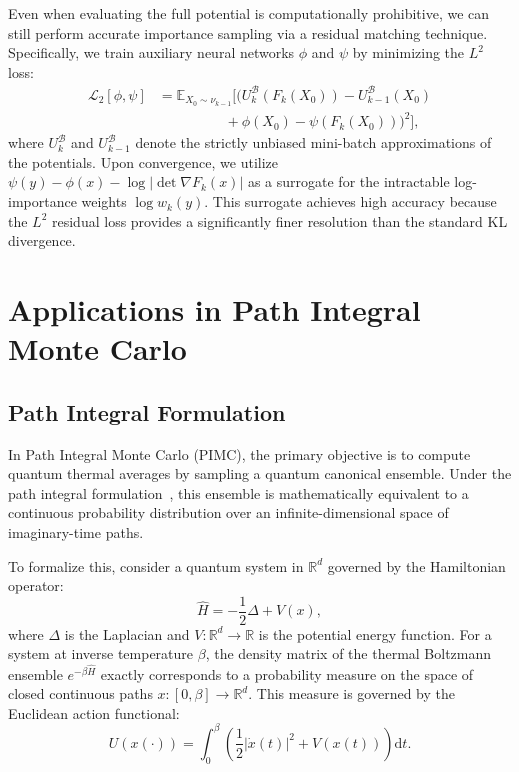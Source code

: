 \documentclass[%
 reprint,
 amsmath,amssymb,
 aps,
 pre,
]{revtex4-2}
\newcommand{\D}{\mathrm{d}}
\begin{document}
Even when evaluating the full potential is computationally prohibitive, we can still perform accurate importance sampling via a residual matching technique. Specifically, we train auxiliary neural networks $\phi$ and $\psi$ by minimizing the $L^2$ loss:
\begin{align*}
    \mathcal{L}_2[\phi, \psi] & = \mathbb{E}_{X_0 \sim \nu_{k-1}} \Big[ \big( U_k^{\mathcal{B}}(F_k(X_0)) - U_{k-1}^{\mathcal{B}}(X_0) \\
    & \hspace{2cm} + \phi(X_0) - \psi(F_k(X_0)) \big)^2 \Big],
\end{align*}
where $U_k^{\mathcal{B}}$ and $U_{k-1}^{\mathcal{B}}$ denote the strictly unbiased mini-batch approximations of the potentials. Upon convergence, we utilize $\psi(y) - \phi(x) - \log |\det \nabla F_k(x)|$ as a surrogate for the intractable log-importance weights $\log w_k(y)$. This surrogate achieves high accuracy because the $L^2$ residual loss provides a significantly finer resolution than the standard KL divergence.

\section{Applications in Path Integral Monte Carlo}

\subsection{Path Integral Formulation}

In Path Integral Monte Carlo (PIMC), the primary objective is to compute quantum thermal averages by sampling a quantum canonical ensemble. Under the path integral formulation~\cite{reed1972methods}, this ensemble is mathematically equivalent to a continuous probability distribution over an infinite-dimensional space of imaginary-time paths.

To formalize this, consider a quantum system in $\mathbb{R}^d$ governed by the Hamiltonian operator:
\begin{equation}
    \hat{H} = -\frac{1}{2} \Delta + V(x),
\end{equation}
where $\Delta$ is the Laplacian and $V: \mathbb{R}^d \to \mathbb{R}$ is the potential energy function. For a system at inverse temperature $\beta$, the density matrix of the thermal Boltzmann ensemble $e^{-\beta \hat{H}}$ exactly corresponds to a probability measure on the space of closed continuous paths $x: [0, \beta] \to \mathbb{R}^d$. This measure is governed by the Euclidean action functional:
\begin{equation}
    U(x(\cdot)) = \int_0^\beta \left( \frac{1}{2} |\dot{x}(t)|^2 + V(x(t)) \right) \D t.
\end{equation}
\end{document}
